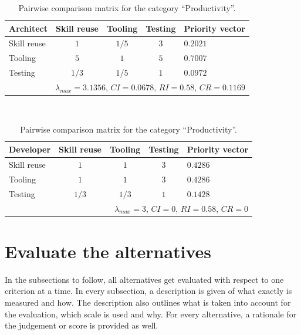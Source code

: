 \begin{table}[h!]
    \begin{center}
        \begin{tabular}{lcccl}
            \hline
            \textbf{Architect} & Skill reuse & Tooling & Testing & Priority vector \\
            \hline
            Skill reuse        & $1$         & $1/5$   & $3$     & $0.2021$        \\
            Tooling            & $5$         & $1$     & $5$     & $0.7007$        \\
            Testing            & $1/3$       & $1/5$   & $1$     & $0.0972$        \\
            \hline
            \multicolumn{5}{r}{$\lambda_{max} = 3.1356$, $CI = 0.0678$, $RI = 0.58$, $CR = 0.1169$}\\
            \hline
        \end{tabular}
        \\\vspace{1em}
        \begin{tabular}{lcccl}
            \hline
            \textbf{Developer} & Skill reuse & Tooling & Testing & Priority vector \\
            \hline
            Skill reuse        & $1$         & $1$     & $3$     & $0.4286$        \\
            Tooling            & $1$         & $1$     & $3$     & $0.4286$        \\
            Testing            & $1/3$       & $1/3$   & $1$     & $0.1428$        \\
            \hline
            \multicolumn{5}{r}{$\lambda_{max} = 3$, $CI = 0$, $RI = 0.58$, $CR = 0$}               \\
            \hline
        \end{tabular}
        \caption{Pairwise comparison matrix for the category ``Productivity''.}
        \label{tab:productivity}
    \end{center}
\end{table}




\section{Evaluate the alternatives}

In the subsections to follow, all alternatives get evaluated with respect to one criterion at a time. In every subsection, a description is given of what exactly is measured and how. The description also outlines what is taken into account for the evaluation, which scale is used and why. For every alternative, a rationale for the judgement or score is provided as well.

